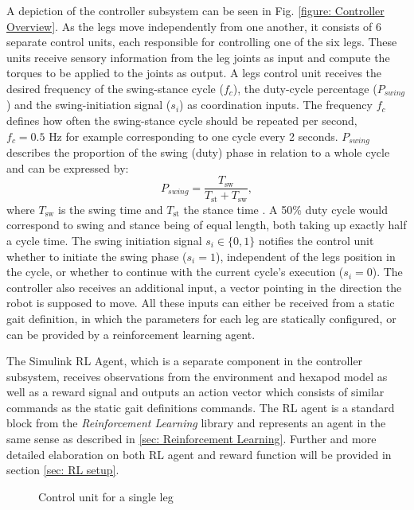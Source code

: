 A depiction of the controller subsystem can be seen in Fig. \ref{figure: Controller Overview}.
As the legs move independently from one another, it consists of 6 separate control units, each responsible for controlling one of the six legs.
These units receive sensory information from the leg joints as input and compute the torques to be applied to the joints as output.
A legs control unit receives the desired frequency of the swing-stance cycle ($f_{c}$), the duty-cycle percentage ($P_{swing}$) and the swing-initiation signal ($s_i$) as coordination inputs.
The frequency $f_{c}$ defines how often the swing-stance cycle should be repeated per second, $f_{c} = 0.5 \text{ Hz}$ for example corresponding to one cycle every 2 seconds.
$P_{swing}$ describes the proportion of the swing (duty) phase in relation to a whole cycle and can be expressed by: 
\[
P_{swing} = \frac{T_{\text{sw}}} {T_{\text{st}} + T_{\text{sw}}}, 
\] 
where $T_{\text{sw}}$ is the swing time and $T_{\text{st}}$ the stance time \parencite{qiu2023adaptive}.
A 50\% duty cycle would correspond to swing and stance being of equal length, both taking up exactly half a cycle time.
The swing initiation signal $s_i \in \{0,1\}$ notifies the control unit whether to initiate the swing phase ($s_i = 1$), independent of the legs position in the cycle, or whether to continue with the current cycle's execution ($s_i = 0$).
The controller also receives an additional input, a vector pointing in the direction the robot is supposed to move.
All these inputs can either be received from a static gait definition, in which the parameters for each leg are statically configured, or can be provided by a reinforcement learning agent.

The Simulink RL Agent, which is a separate component in the controller subsystem, receives observations from the environment and hexapod model as well as a reward signal and outputs an action vector which consists of similar commands as the static gait definitions commands.
The RL agent is a standard block from the \textit{Reinforcement Learning} library and represents an agent in the same sense as described in \ref{sec: Reinforcement Learning}.
Further and more detailed elaboration on both RL agent and reward function will be provided in section \ref{sec: RL setup}.

\begin{figure}
	\centerline{}
	\caption{Control unit for a single leg}
	\label{figure: Leg control unit}
\end{figure}

